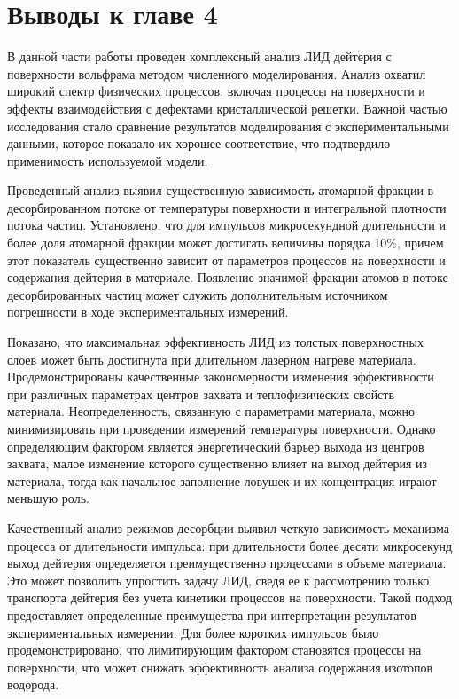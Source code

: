 \section{Выводы к главе 4}

В данной части работы проведен комплексный анализ ЛИД дейтерия с поверхности вольфрама методом численного моделирования. Анализ охватил широкий спектр физических процессов, включая процессы на поверхности и эффекты взаимодействия с дефектами кристаллической решетки. Важной частью исследования стало сравнение результатов моделирования с экспериментальными данными, которое показало их хорошее соответствие, что подтвердило применимость используемой модели.

Проведенный анализ выявил существенную зависимость атомарной фракции в десорбированном потоке от температуры поверхности и интегральной плотности потока частиц. Установлено, что для импульсов микросекундной длительности и более доля атомарной фракции может достигать величины порядка 10\%, причем этот показатель существенно зависит от параметров процессов на поверхности и содержания дейтерия в материале. Появление значимой фракции атомов в потоке десорбированных частиц может служить дополнительным источником погрешности в ходе экспериментальных измерений.

Показано, что максимальная эффективность ЛИД из толстых поверхностных слоев может быть достигнута при длительном лазерном нагреве материала. Продемонстрированы качественные закономерности изменения эффективности при различных параметрах центров захвата и теплофизических свойств материала. Неопределенность, связанную с параметрами материала, можно минимизировать при проведении измерений температуры поверхности. Однако определяющим фактором является энергетический барьер выхода из центров захвата, малое изменение которого существенно влияет на выход дейтерия из материала, тогда как начальное заполнение ловушек и их концентрация играют меньшую роль. 

Качественный анализ режимов десорбции выявил четкую зависимость механизма процесса от длительности импульса: при длительности более десяти микросекунд выход дейтерия определяется преимущественно процессами в объеме материала. Это может позволить упростить задачу ЛИД, сведя ее к рассмотрению только транспорта дейтерия без учета кинетики процессов на поверхности. Такой подход предоставляет определенные преимущества при интерпретации результатов экспериментальных измерении. Для более коротких импульсов было продемонстрировано, что лимитирующим фактором становятся процессы на поверхности, что может снижать эффективность анализа содержания изотопов водорода.


\clearpage
